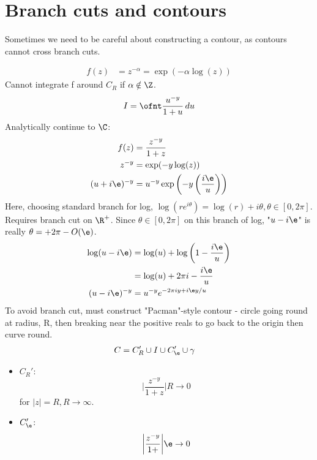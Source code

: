 \documentclass[a4paper, 11pt, normalem]{report}
\begin{document}
\section{Branch cuts and contours}
Sometimes we need to be careful about constructing a contour, as contours cannot cross branch cuts.
\begin{example}
    \begin{align}
        f(z) &= z^{-\alpha} = \exp(-\alpha\log(z))
    \end{align}
    Cannot integrate f around $C_R$ if $\alpha \notin \Z$.
    \begin{equation}
        I = \ofnt \frac{u^{-y}}{1 + u}\,du
    \end{equation}
    Analytically continue to $\C$:
    \begin{align}
        f(z) &= \frac{z^{-y}}{1+z} \\
        z^{-y} &= \exp(-y\log(z)) \\
        (u + i\e)^{-y} &= u^{-y}\exp\left(-y\left(\frac{i\e}{u}\right)\right)
    \end{align}
    Here, choosing standard branch for log, $\log(re^{i\theta}) = \log(r)+i\theta, \theta \in [0,2\pi]$. 
    Requires branch cut on $\R^+$.
    Since $\theta \in [0,2\pi]$ on this branch of log, "$u - i\e$" is really $\theta = +2\pi - O(\e)$.
    \begin{align}
        \log(u-i\e) &= \log(u) + \log\left(1 - \frac{i\e}{u}\right) \\
                    &= \log(u) + 2\pi i - \frac{i\e}{u} \\
        (u-i\e)^{-y} &= u^{-y}e^{-2\pi iy + i\e y/u}
    \end{align}
    To avoid branch cut, must construct "Pacman"-style contour - circle going round at radius, R, then breaking near the positive reals to go back to the origin then curve round. 
    \begin{align}
        C &= C_R' \cup I \cup C_\e' \cup \gamma 
    \end{align}
    \begin{itemize}
        \item $C_R'$:
            \begin{equation}
                \bigg|\frac{z^{-y}}{1+z}\bigg|R \to 0
            \end{equation}
            for $|z| = R, R \to \infty$.
        \item $C_\e'$:
            \begin{equation}
                \bigg|\frac{z^{-y}}{1+}\bigg|\e \to 0

\end{equation}
\end{itemize}
\end{example}
\end{document}
